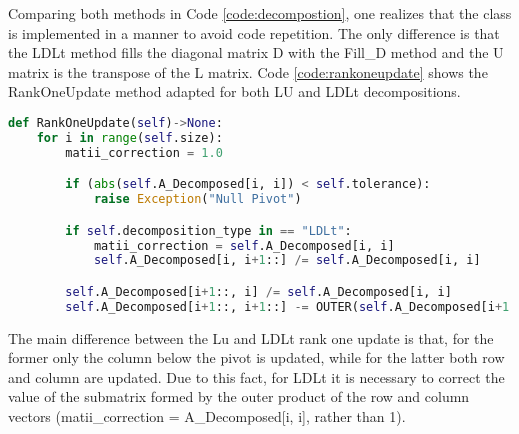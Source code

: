 Comparing both methods in Code \ref{code:decompostion}, one realizes that the class is implemented in a manner to avoid code repetition. The only difference is that the LDLt method fills the diagonal matrix D with the Fill\_D method and the U matrix is the transpose of the L matrix. Code \ref{code:rankoneupdate} shows the RankOneUpdate method adapted for both LU and LDLt decompositions.
\begin{lstlisting}[language=Python, caption={RankOneUpdate method.}, label={code:rankoneupdate}]
def RankOneUpdate(self)->None:
    for i in range(self.size):
        matii_correction = 1.0

        if (abs(self.A_Decomposed[i, i]) < self.tolerance):
            raise Exception("Null Pivot")

        if self.decomposition_type in == "LDLt":
            matii_correction = self.A_Decomposed[i, i]
            self.A_Decomposed[i, i+1::] /= self.A_Decomposed[i, i]

        self.A_Decomposed[i+1::, i] /= self.A_Decomposed[i, i]
        self.A_Decomposed[i+1::, i+1::] -= OUTER(self.A_Decomposed[i+1::, i], self.A_Decomposed[i, i+1::]) * matii_correction
\end{lstlisting}

The main difference between the Lu and LDLt rank one update is that, for the former only the column below the pivot is updated, while for the latter both row and column are updated. Due to this fact, for LDLt it is necessary to correct the value of the submatrix formed by the outer product of the row and column vectors (matii\_correction = A\_Decomposed[i, i], rather than 1).

